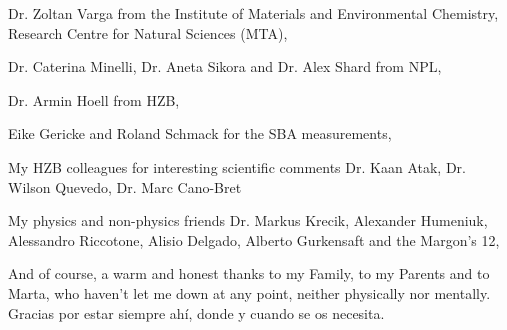\noindent Dr. Zoltan Varga from the Institute of Materials and Environmental Chemistry, Research Centre for Natural Sciences (MTA),
\vspace{2ex}

\noindent Dr. Caterina Minelli, Dr. Aneta Sikora and Dr. Alex Shard from NPL,
\vspace{2ex}

\noindent Dr. Armin Hoell from HZB,
\vspace{2ex}

\noindent Eike Gericke and Roland Schmack for the SBA measurements,
\vspace{2ex}

\noindent My HZB colleagues for interesting scientific comments Dr. Kaan Atak, Dr. Wilson Quevedo, Dr. Marc Cano-Bret
\vspace{2ex}

\noindent My physics and non-physics friends Dr. Markus Krecik, Alexander Humeniuk, Alessandro Riccotone, Alisio Delgado, Alberto Gurkensaft and the Margon's 12,
\vspace{2ex}

\noindent And of course, a warm and honest thanks to my Family, to my Parents and to Marta, who haven't let me down at any point, neither physically nor mentally. Gracias por estar siempre ahí, donde y cuando se os necesita.

\cleardoublepage
